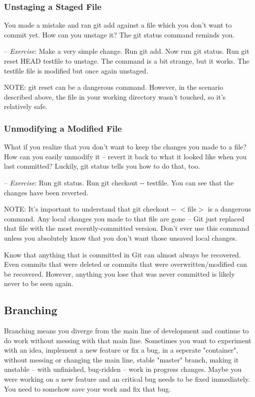 \documentclass[12pt,a4]{article}
\newcommand{\ilcode}[1]{\textcolor[RGB]{160, 110, 220}{#1}}
\begin{document}
\subsubsection{Unstaging a Staged File}
You made a mistake and ran \ilcode{git add} against a file which you don't want
to commit yet. How can you unstage it? The \ilcode{git status} command reminds
you.

{\sf -- \emph{Exercise}:} Make a very simple change. Run \ilcode{git add}. Now
run \ilcode{git status}. Run \ilcode{git reset HEAD testfile} to unstage. The
command is a bit strange, but it works. The testfile file is modified but once
again unstaged.

{\sf NOTE:} \ilcode{git reset} can be a dangerous command. However, in the
scenario described above, the file in your working directory wasn't touched, so
it’s relatively safe.

\subsubsection{Unmodifying a Modified File}
What if you realize that you don’t want to keep the changes you made to a file?
How can you easily unmodify it -- revert it back to what it looked like when you
last committed? Luckily, \ilcode{git status} tells you how to do that, too.

{\sf -- \emph{Exercise}:} Run \ilcode{git status}. Run \ilcode{git checkout
-{}- testfile}. You can see that the changes have been reverted.

{\sf NOTE:} It’s important to understand that \ilcode{git checkout -{}-
$<$file$>$} is a dangerous command. Any local changes you made to that file are
gone -- Git just replaced that file with the most recently-committed version.
Don’t ever use this command unless you absolutely know that you don’t want those
unsaved local changes.

Know that anything that is committed in Git can almost always be recovered. Even
commits that were deleted or commits that were overwritten/modified can be
recovered. However, anything you lose that was never committed is likely never
to be seen again.

\subsection{Branching}
Branching means you diverge from the main line of development and continue to do
work without messing with that main line. Sometimes you want to experiment with
an idea, implement a new feature or fix a bug, in a seperate "container",
without messing or changing the main line, stable "master" branch, making it
unstable -- with unfinished, bug-ridden -- work in progress changes. Maybe you
were working on a new feature and an critical bug needs to be fixed immediately.
You need to somehow save your work and fix that bug.
\end{document}
